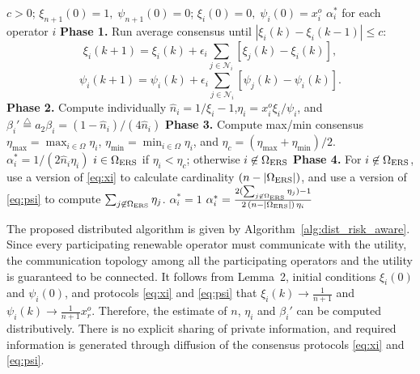 \documentclass[conference]{IEEEtran}
\begin{document}
\begin{algorithm}[hbt]
\caption{Distributed Risk-Aware Nash Optimization}
\label{alg:dist_risk_aware}
\begin{algorithmic}[1]
\Require $c>0$;\; $\xi_{n+1}(0)=1,\;\psi_{n+1}(0)=0$;\; $\xi_i(0)=0,\;\psi_i(0)=x_i^o$
\Ensure $\alpha_i^*$ for each operator $i$
\State \textbf{Phase 1.} Run average consensus until $|\xi_i(k)-\xi_i(k-1)|\leq c$:
\begin{equation}
    \xi_i(k+1) = \xi_i(k) + \epsilon_i \sum_{j \in \mathcal{N}_i} [\xi_j(k) - \xi_i(k)], \label{eq:xi}
\end{equation}
\begin{equation}
\psi_i(k+1) = \psi_i(k) + \epsilon_i \sum_{j \in \mathcal{N}_i} [\psi_j(k) - \psi_i(k)]. \label{eq:psi}
\end{equation}
\State \textbf{Phase 2.} Compute individually \quad  $\hat{n}_i = 1/\xi_i - 1$,\quad  $\eta_i = x_i^o\xi_i/\psi_i$, \quad  and \quad $\beta_i' \stackrel{\triangle}{=} a_2\beta_i = (1-\hat{n}_i)/(4\hat{n}_i)$
\State \textbf{Phase 3.} Compute max/min consensus \quad  $\eta_{\max}=\max_{i\in\Omega} \eta_i$, \quad $\eta_{\min}=\min_{i\in\Omega} \eta_i$, \quad and \quad $\eta_c = (\eta_{\max}+\eta_{\min})/2$.
    \State $\alpha_i^* = 1/(2\hat{n}_i\eta_i)$
\Else 
    \State $i\in \Omega_{\rm ERS}$ if $\eta_i<\eta_c$; otherwise $i\not\in \Omega_{\rm ERS}$
    \State \textbf{Phase 4.} For $i\not\in \Omega_{\rm ERS}$, use a version of \eqref{eq:xi} to calculate cardinality $(n-|\Omega_{\rm ERS}|)$, and use a version of \eqref{eq:psi} to compute $\sum_{j\not\in \Omega_{\rm ERS}}\eta_j$. 
        \State $\alpha_i^* = 1$
    \Else
        \State $\alpha_i^*=\tfrac{2(\sum_{j\not\in \Omega_{\rm ERS}}\eta_j)-1}{2\,(n-|\Omega_{\rm ERS}|)\,\eta_i}$
    \EndIf
\EndIf
\end{algorithmic}
\end{algorithm}

The proposed distributed algorithm is given by Algorithm~\ref{alg:dist_risk_aware}. Since every participating renewable operator must communicate with the utility, the communication topology among all the participating operators and the utility is guaranteed to be connected. It follows from Lemma~2, initial conditions $\xi_i(0)$ and $\psi_i(0)$, and protocols \eqref{eq:xi} and \eqref{eq:psi} that $\xi_i(k)\rightarrow \frac{1}{n+1}$ and $\psi_i(k)\rightarrow \frac{1}{n+1}x_r^o$. Therefore, the estimate of $n$, $\eta_i$ and $\beta_i'$ can be computed distributively. There is no explicit sharing of private information, and required information is generated through diffusion of the consensus protocols \eqref{eq:xi} and \eqref{eq:psi}.
\end{document}
